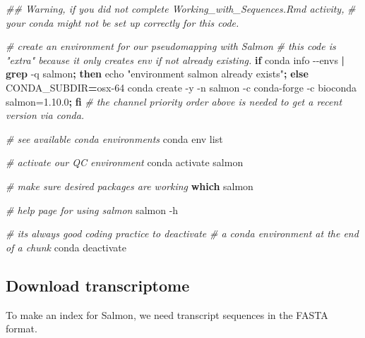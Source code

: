 \documentclass[
]{book}
\newenvironment{Shaded}{\begin{snugshade}}{\end{snugshade}}
\newcommand{\AttributeTok}[1]{\textcolor[rgb]{0.13,0.29,0.53}{#1}}
\newcommand{\BuiltInTok}[1]{#1}
\newcommand{\CommentTok}[1]{\textcolor[rgb]{0.56,0.35,0.01}{\textit{#1}}}
\newcommand{\ControlFlowTok}[1]{\textcolor[rgb]{0.13,0.29,0.53}{\textbf{#1}}}
\newcommand{\ExtensionTok}[1]{#1}
\newcommand{\FunctionTok}[1]{\textcolor[rgb]{0.13,0.29,0.53}{\textbf{#1}}}
\newcommand{\KeywordTok}[1]{\textcolor[rgb]{0.13,0.29,0.53}{\textbf{#1}}}
\newcommand{\NormalTok}[1]{#1}
\newcommand{\OperatorTok}[1]{\textcolor[rgb]{0.81,0.36,0.00}{\textbf{#1}}}
\newcommand{\StringTok}[1]{\textcolor[rgb]{0.31,0.60,0.02}{#1}}
\newcommand{\VariableTok}[1]{\textcolor[rgb]{0.00,0.00,0.00}{#1}}
\begin{document}
\begin{Shaded}
\begin{Highlighting}[]
\CommentTok{\#\# Warning, if you did not complete Working\_with\_Sequences.Rmd activity, }
\CommentTok{\#    your conda might not be set up correctly for this code.}

\CommentTok{\# create an environment for our pseudomapping with Salmon}
\CommentTok{\# this code is "extra" because it only creates env if not already existing.}
\ControlFlowTok{if} \ExtensionTok{conda}\NormalTok{ info }\AttributeTok{{-}{-}envs} \KeywordTok{|} \FunctionTok{grep} \AttributeTok{{-}q}\NormalTok{ salmon}\KeywordTok{;} \ControlFlowTok{then} \BuiltInTok{echo} \StringTok{"environment \textquotesingle{}salmon\textquotesingle{} already exists"}\KeywordTok{;} \ControlFlowTok{else} \VariableTok{CONDA\_SUBDIR}\OperatorTok{=}\NormalTok{osx{-}64 }\ExtensionTok{conda}\NormalTok{ create }\AttributeTok{{-}y} \AttributeTok{{-}n}\NormalTok{ salmon }\AttributeTok{{-}c}\NormalTok{ conda{-}forge }\AttributeTok{{-}c}\NormalTok{ bioconda salmon=1.10.0}\KeywordTok{;} \ControlFlowTok{fi}
\CommentTok{\# the channel priority order above is needed to get a recent version via conda.}

\CommentTok{\# see available conda environments}
\ExtensionTok{conda}\NormalTok{ env list}

\CommentTok{\# activate our QC environment}
\ExtensionTok{conda}\NormalTok{ activate salmon}

\CommentTok{\# make sure desired packages are working}
\FunctionTok{which}\NormalTok{ salmon}

\CommentTok{\# help page for using salmon}
\ExtensionTok{salmon} \AttributeTok{{-}h}

\CommentTok{\# it\textquotesingle{}s always good coding practice to deactivate }
\CommentTok{\# a conda environment at the end of a chunk}
\ExtensionTok{conda}\NormalTok{ deactivate}
\end{Highlighting}
\end{Shaded}

\hypertarget{download-transcriptome}{%
\subsection{Download transcriptome}\label{download-transcriptome}}

To make an index for Salmon, we need transcript sequences in the FASTA format.
\end{document}
